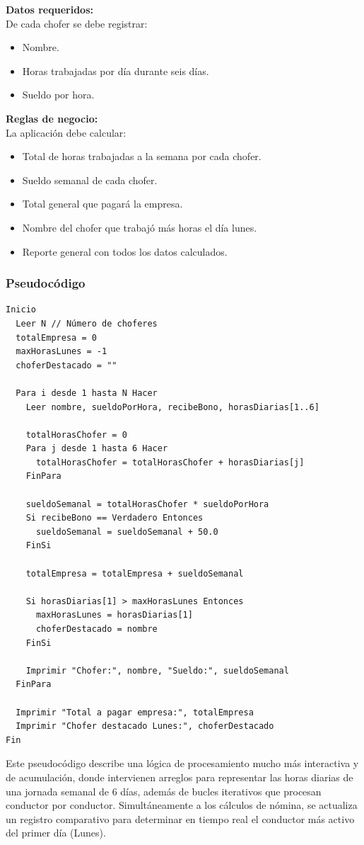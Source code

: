 \documentclass[12pt, a4paper]{article}
\begin{document}
\textbf{Datos requeridos:}\\
De cada chofer se debe registrar:
\begin{itemize}
    \item Nombre.
    \item Horas trabajadas por día durante seis días.
    \item Sueldo por hora.
\end{itemize}

\textbf{Reglas de negocio:}\\
La aplicación debe calcular:
\begin{itemize}
    \item Total de horas trabajadas a la semana por cada chofer.
    \item Sueldo semanal de cada chofer.
    \item Total general que pagará la empresa.
    \item Nombre del chofer que trabajó más horas el día lunes.
    \item Reporte general con todos los datos calculados.
\end{itemize}

\subsubsection{Pseudocódigo}
\begin{verbatim}
Inicio
  Leer N // Número de choferes
  totalEmpresa = 0
  maxHorasLunes = -1
  choferDestacado = ""
  
  Para i desde 1 hasta N Hacer
    Leer nombre, sueldoPorHora, recibeBono, horasDiarias[1..6]
    
    totalHorasChofer = 0
    Para j desde 1 hasta 6 Hacer
      totalHorasChofer = totalHorasChofer + horasDiarias[j]
    FinPara
    
    sueldoSemanal = totalHorasChofer * sueldoPorHora
    Si recibeBono == Verdadero Entonces
      sueldoSemanal = sueldoSemanal + 50.0
    FinSi
    
    totalEmpresa = totalEmpresa + sueldoSemanal
    
    Si horasDiarias[1] > maxHorasLunes Entonces
      maxHorasLunes = horasDiarias[1]
      choferDestacado = nombre
    FinSi
    
    Imprimir "Chofer:", nombre, "Sueldo:", sueldoSemanal
  FinPara
  
  Imprimir "Total a pagar empresa:", totalEmpresa
  Imprimir "Chofer destacado Lunes:", choferDestacado
Fin
\end{verbatim}
\vspace{0.3cm}
Este pseudocódigo describe una lógica de procesamiento mucho más interactiva y de acumulación, donde intervienen arreglos para representar las horas diarias de una jornada semanal de 6 días, además de bucles iterativos que procesan conductor por conductor. Simultáneamente a los cálculos de nómina, se actualiza un registro comparativo para determinar en tiempo real el conductor más activo del primer día (Lunes).
\end{document}
